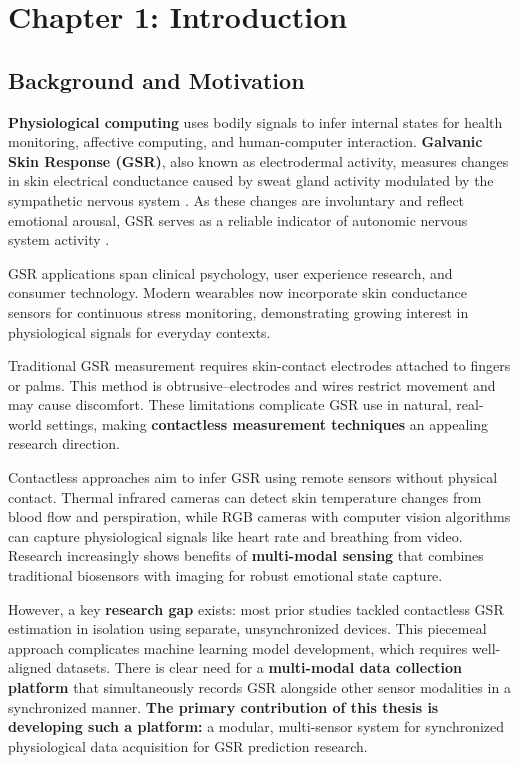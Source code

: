 \label{chap:1}
\chapter{Chapter 1: Introduction}

\section{Background and Motivation}

\textbf{Physiological computing} uses bodily signals to infer internal states for health monitoring, affective computing, and human-computer interaction. \textbf{Galvanic Skin Response (GSR)}, also known as electrodermal activity, measures changes in skin electrical conductance caused by sweat gland activity modulated by the sympathetic nervous system \cite{Boucsein2012}. As these changes are involuntary and reflect emotional arousal, GSR serves as a reliable indicator of autonomic nervous system activity \cite{Fowles1981}.

GSR applications span clinical psychology, user experience research, and consumer technology. Modern wearables now incorporate skin conductance sensors for continuous stress monitoring, demonstrating growing interest in physiological signals for everyday contexts.

Traditional GSR measurement requires skin-contact electrodes attached to fingers or palms. This method is obtrusive--electrodes and wires restrict movement and may cause discomfort. These limitations complicate GSR use in natural, real-world settings, making \textbf{contactless measurement techniques} an appealing research direction.

Contactless approaches aim to infer GSR using remote sensors without physical contact. Thermal infrared cameras can detect skin temperature changes from blood flow and perspiration, while RGB cameras with computer vision algorithms can capture physiological signals like heart rate and breathing from video. Research increasingly shows benefits of \textbf{multi-modal sensing} that combines traditional biosensors with imaging for robust emotional state capture.

However, a key \textbf{research gap} exists: most prior studies tackled contactless GSR estimation in isolation using separate, unsynchronized devices. This piecemeal approach complicates machine learning model development, which requires well-aligned datasets. There is clear need for a \textbf{multi-modal data collection platform} that simultaneously records GSR alongside other sensor modalities in a synchronized manner. \textbf{The primary contribution of this thesis is developing such a platform:} a modular, multi-sensor system for synchronized physiological data acquisition for GSR prediction research.

